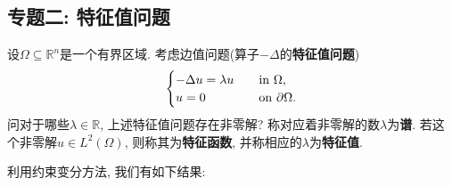 \documentclass[12pt,a4paper]{article}
\begin{document}

\subsection{专题二: 特征值问题}

设$\Omega \subseteq \mathbb{R}^n$是一个有界区域. 考虑边值问题(算子$-\Delta$的\textbf{特征值问题}) 
\begin{equation}\label{43}
    \begin{cases}
        -\Delta u = \lambda u \quad &{\rm in}\ \Omega, \\ 
        u = 0 \quad &{\rm on}\ \partial\Omega.
    \end{cases}
\end{equation}
问对于哪些$\lambda \in \mathbb{R}$, 上述特征值问题存在非零解? 
称对应着非零解的数$\lambda$为\textbf{谱}. 若这个非零解$u \in L^2(\Omega)$, 则称其为\textbf{特征函数}, 并称相应的$\lambda$为\textbf{特征值}.

利用约束变分方法, 我们有如下结果:
\end{document}
